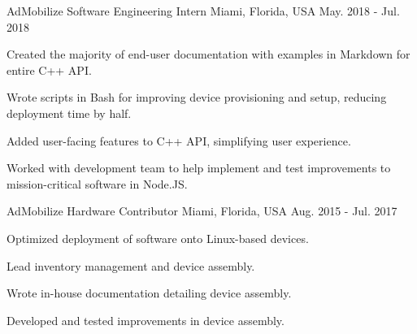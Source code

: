 \begin{cventries}
  \cventry
    {AdMobilize} %
    {Software Engineering Intern} %
    {Miami, Florida, USA} %
    {May. 2018 - Jul. 2018} %
    {
      \begin{cvitems} %
        \item {Created the majority of end-user documentation with examples in Markdown for entire C++ API.}
        \item {Wrote scripts in Bash for improving device provisioning and setup, reducing deployment time by half.}
        \item {Added user-facing features to C++ API, simplifying user experience.}
        \item {Worked with development team to help implement and test improvements to mission-critical software in Node.JS.}
      \end{cvitems}
    }

  \cventry
    {AdMobilize} %
    {Hardware Contributor} %
    {Miami, Florida, USA} %
    {Aug. 2015 - Jul. 2017} %
    {
      \begin{cvitems} %
        \item {Optimized deployment of software onto Linux-based devices.}
        \item {Lead inventory management and device assembly.}
        \item {Wrote in-house documentation detailing device assembly.}
        \item {Developed and tested improvements in device assembly.}
      \end{cvitems}
    }

\end{cventries}
